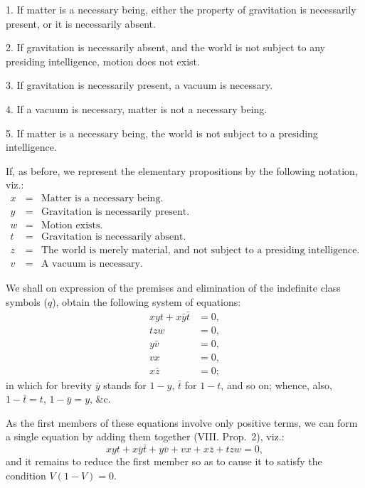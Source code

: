\documentclass[oneside]{book}
\begin{document}
1. If matter is a necessary being, either the property of gravitation
is necessarily present, or it is necessarily absent.

2. If gravitation is necessarily absent, and the world is not
subject to any presiding intelligence, motion does not exist.

3. If gravitation is necessarily present, a vacuum is necessary.

4. If a vacuum is necessary, matter is not a necessary being.

5. If matter is a necessary being, the world is not subject
to a presiding intelligence.

If, as before, we represent the elementary propositions by the
following notation, viz.:
\begin{eqnarray*}%
  x &=& \textrm{Matter is a necessary being.}   \\
  y &=& \textrm{Gravitation is necessarily present.}   \\
  w &=& \textrm{Motion exists.}   \\
  t &=& \textrm{Gravitation is necessarily absent.}   \\
  z &=& \textrm{The world is merely material, and not subject to
a presiding intelligence.}   \\
  v &=& \textrm{A vacuum is necessary.}
\end{eqnarray*}


We shall on expression of the premises and elimination of the
indefinite class symbols ($q$), obtain the following system of equations:
\begin{eqnarray*}
xyt + x\bar{y}\bar{t} &= 0,   \\
                  tzw &= 0,   \\
             y\bar{v} &= 0,   \\
                   vx &= 0,   \\
             x\bar{z} &= 0;
\end{eqnarray*}
in which for brevity $\bar{y}$ stands for $1-y$, $\bar{t}$ for $1-t$, and
so on; whence, also, $1-\bar{t} = t$, $1-\bar{y} = y$, \&c.

As the first members of these equations involve only positive
terms, we can form a single equation by adding them together
(VIII. Prop.~2), viz.:
\[
xyt + x\bar{y}\bar{t} + y\bar{v} + vx + x\bar{z} + tzw = 0,
\]
and it remains to reduce the first member so as to cause it to
satisfy the condition $V(1-V) = 0$.
\end{document}

